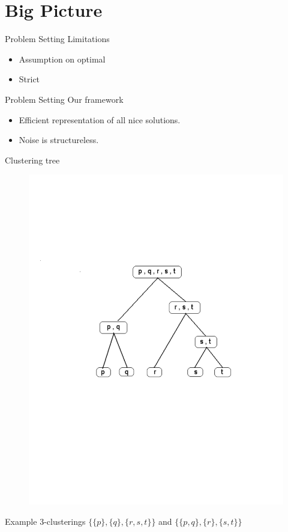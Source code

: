 \documentclass{beamer}
\begin{document}
\section{Big Picture}

\begin{frame}{Problem Setting}
  Limitations
  \begin{itemize}
  	\item Assumption on optimal %
  	\item Strict %
  \end{itemize}
\end{frame}

\begin{frame}{Problem Setting}
  Our framework
  \begin{itemize}
  	\item Efficient representation of all nice solutions.
  	\item Noise is structureless.
  \end{itemize}
\end{frame}

\begin{frame}{Clustering tree}
	\begin{figure}
	  \includegraphics[trim = 50 150 50 200, clip, width=0.8\linewidth]{hier.pdf}
	\end{figure}
	\vspace{-1in}Example 3-clusterings $\{\{p\}, \{q\}, \{r, s, t\}\}$ and $\{\{p, q\}, \{r\}, \{s, t\}\}$
\end{frame}
\end{document}
